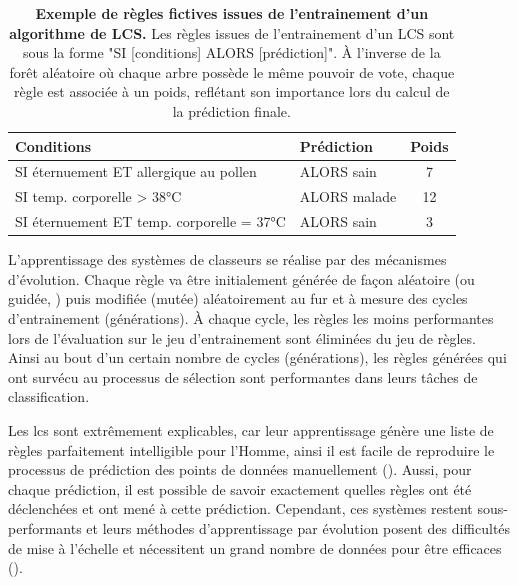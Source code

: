 \begin{table}[htbp]
\centering
\begin{tabular}{|l|l|c|} 
 \hline
 Conditions & Prédiction & Poids \\
 \hline
 SI éternuement ET allergique au pollen & ALORS sain & 7 \\ 
 SI temp. corporelle > 38°C & ALORS malade & 12 \\ 
 SI éternuement ET temp. corporelle = 37°C & ALORS sain & 3 \\ 
 \hline

\end{tabular}
\caption[Exemple de règles fictives issues de l'entrainement d'un algorithme de LCS]{\textbf{Exemple de règles fictives issues de l'entrainement d'un algorithme de LCS.} Les règles issues de l'entrainement d'un LCS sont sous la forme "SI [conditions] ALORS [prédiction]". À l'inverse de la forêt aléatoire où chaque arbre possède le même pouvoir de vote, chaque règle est associée à un poids, reflétant son importance lors du calcul de la prédiction finale.}
\label{table:lcs-rules}
\end{table}

L'apprentissage des systèmes de classeurs se réalise par des mécanismes d'évolution. Chaque règle va être initialement générée de façon aléatoire (ou guidée, \cite{urbanowicz_relief-based_2018}) puis modifiée (mutée) aléatoirement au fur et à mesure des cycles d'entrainement (générations). À chaque cycle, les règles les moins performantes lors de l'évaluation sur le jeu d'entrainement sont éliminées du jeu de règles. Ainsi au bout d'un certain nombre de cycles (générations), les règles générées qui ont survécu au processus de sélection sont performantes dans leurs tâches de classification.

Les \gls{lcs} sont extrêmement explicables, car leur apprentissage génère une liste de règles parfaitement intelligible pour l'Homme, ainsi il est facile de reproduire le processus de prédiction des points de données manuellement (\cite{arrieta_explainable_2019}). Aussi, pour chaque prédiction, il est possible de savoir exactement quelles règles ont été déclenchées et ont mené à cette prédiction. Cependant, ces systèmes restent sous-performants et leurs méthodes d'apprentissage par évolution posent des difficultés de mise à l'échelle et nécessitent un grand nombre de données pour être efficaces (\cite{urbanowicz_exstracs_2015}).

